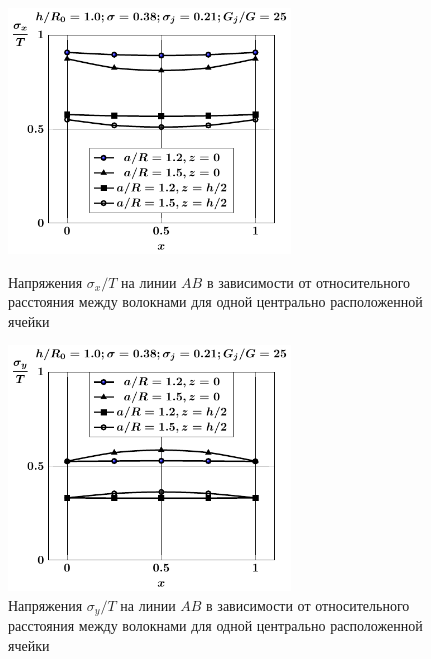 \begin{russian}
\begin{figure}[h!]
\centering\footnotesize
\parbox[b]{7.5cm}{\centering\includegraphics[width=7.5cm]{inc7-a-sig_x.pdf}
\caption{Напряжения $\sigma_x/T$ на линии $AB$ в зависимости от относительного расстояния между волокнами для одной центрально расположенной ячейки
\label{f:7:80}}}\hfil\hfil
\parbox[b]{7.5cm}{\centering\includegraphics[width=7.5cm]{inc7-a-sig_y.pdf}
\caption{Напряжения $\sigma_y/T$ на линии $AB$ в зависимости от относительного расстояния между волокнами для одной центрально расположенной ячейки
\label{f:7:81}}}
\end{figure}

%


\end{russian}
